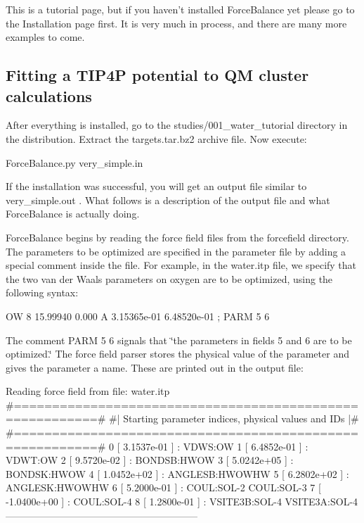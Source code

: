 \-This is a tutorial page, but if you haven't installed \-Force\-Balance yet please go to the \-Installation page first. \-It is very much in process, and there are many more examples to come.\hypertarget{tutorial_tip4p}{}\subsection{\-Fitting a T\-I\-P4\-P potential to Q\-M cluster calculations}\label{tutorial_tip4p}
\-After everything is installed, go to the {\ttfamily studies/001\-\_\-water\-\_\-tutorial} directory in the distribution. \-Extract the {\ttfamily targets.\-tar.\-bz2} archive file. \-Now execute\-:

\begin{DoxyVerb}
ForceBalance.py very_simple.in
\end{DoxyVerb}


\-If the installation was successful, you will get an output file similar to {\ttfamily very\-\_\-simple.\-out} . \-What follows is a description of the output file and what \-Force\-Balance is actually doing.

\-Force\-Balance begins by reading the force field files from the {\ttfamily forcefield} directory. \-The parameters to be optimized are specified in the parameter file by adding a special comment inside the file. \-For example, in the {\ttfamily water.\-itp} file, we specify that the two van der \-Waals parameters on oxygen are to be optimized, using the following syntax\-:

\begin{DoxyVerb}
OW	8     15.99940     0.000       A    3.15365e-01  6.48520e-01 ; PARM 5 6
\end{DoxyVerb}


\-The comment {\ttfamily \-P\-A\-R\-M 5 6} signals that \char`\"{}the parameters in fields 5
and 6 are to be optimized.\char`\"{} \-The force field parser stores the physical value of the parameter and gives the parameter a name. \-These are printed out in the output file\-:

\begin{DoxyVerb}
Reading force field from file: water.itp
#=========================================================#
#|  Starting parameter indices, physical values and IDs  |#
#=========================================================#
   0 [  3.1537e-01 ] : VDWS:OW
   1 [  6.4852e-01 ] : VDWT:OW
   2 [  9.5720e-02 ] : BONDSB:HWOW
   3 [  5.0242e+05 ] : BONDSK:HWOW
   4 [  1.0452e+02 ] : ANGLESB:HWOWHW
   5 [  6.2802e+02 ] : ANGLESK:HWOWHW
   6 [  5.2000e-01 ] : COUL:SOL-2 COUL:SOL-3
   7 [ -1.0400e+00 ] : COUL:SOL-4
   8 [  1.2800e-01 ] : VSITE3B:SOL-4 VSITE3A:SOL-4
-----------------------------------------------------------
\end{DoxyVerb}


